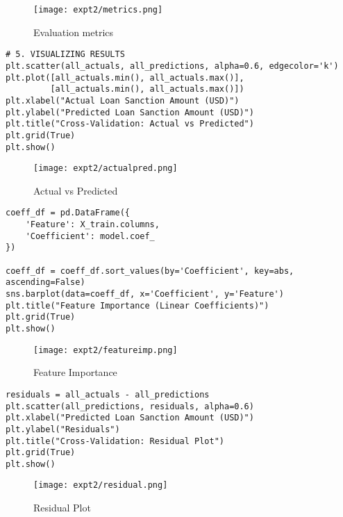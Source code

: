 \documentclass[11pt]{article}
\begin{document}
\begin{figure}[H]
\centering
\texttt{[image: expt2/metrics.png]} 
\caption{Evaluation metrics}
\end{figure}

\begin{verbatim}
# 5. VISUALIZING RESULTS
plt.scatter(all_actuals, all_predictions, alpha=0.6, edgecolor='k')
plt.plot([all_actuals.min(), all_actuals.max()],
         [all_actuals.min(), all_actuals.max()])
plt.xlabel("Actual Loan Sanction Amount (USD)")
plt.ylabel("Predicted Loan Sanction Amount (USD)")
plt.title("Cross-Validation: Actual vs Predicted")
plt.grid(True)
plt.show()
\end{verbatim}

\begin{figure}[H]
\centering
\texttt{[image: expt2/actualpred.png]} 
\caption{Actual vs Predicted}
\end{figure}

\begin{verbatim}
coeff_df = pd.DataFrame({
    'Feature': X_train.columns,
    'Coefficient': model.coef_
})

coeff_df = coeff_df.sort_values(by='Coefficient', key=abs, ascending=False)
sns.barplot(data=coeff_df, x='Coefficient', y='Feature')
plt.title("Feature Importance (Linear Coefficients)")
plt.grid(True)
plt.show()
\end{verbatim}

\begin{figure}[H]
\centering
\texttt{[image: expt2/featureimp.png]} 
\caption{Feature Importance}
\end{figure}

\begin{verbatim}
residuals = all_actuals - all_predictions
plt.scatter(all_predictions, residuals, alpha=0.6)
plt.xlabel("Predicted Loan Sanction Amount (USD)")
plt.ylabel("Residuals")
plt.title("Cross-Validation: Residual Plot")
plt.grid(True)
plt.show()
\end{verbatim}

\begin{figure}[H]
\centering
\texttt{[image: expt2/residual.png]} 
\caption{Residual Plot}
\end{figure}

\noindent
\end{document}
